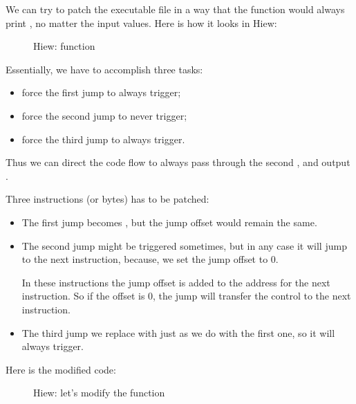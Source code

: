 



\clearpage
{}

We can try to patch the executable file in a way 
that the  function would always print , 
no matter the input values.
Here is how it looks in Hiew:

\begin{figure}[H]
\centering
{}
\caption{Hiew:  function}
\label{fig:jcc_hiew_1}
\end{figure}

Essentially, we have to accomplish three tasks:
\begin{itemize}
\item force the first jump to always trigger;
\item force the second jump to never trigger;
\item force the third jump to always trigger.
\end{itemize}

Thus we can direct the code flow to always pass through the second \printf, and output .

Three instructions (or bytes) has to be patched:

\begin{itemize}
\item The first jump becomes \JMP, but the \gls{jump offset} would remain the same.

\item 
The second jump might be triggered sometimes, but in any case it will jump to the next
instruction, because, we set the \gls{jump offset} to 0.

In these instructions the \gls{jump offset} is added to the address for the next instruction.
So if the offset is 0,
the jump will transfer the control to the next instruction.

\item 
The third jump we replace with \JMP just as we do with the first one, so it will always trigger.

\end{itemize}

\clearpage
Here is the modified code:

\begin{figure}[H]
\centering
{}
\caption{Hiew: let's modify the  function}
\label{fig:jcc_hiew_2}
\end{figure}

